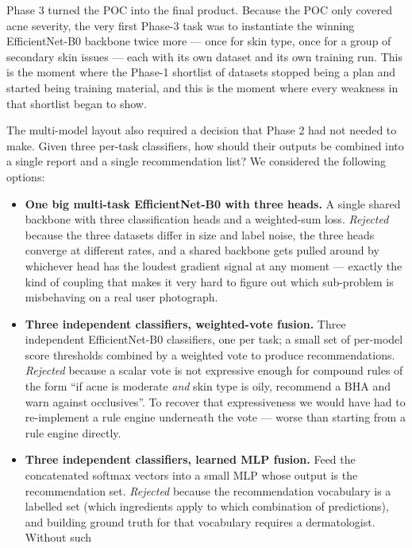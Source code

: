\documentclass[11pt,a4paper,oneside]{report}
\newcommand{\effnet}{EfficientNet-B0\xspace}
\begin{document}
Phase 3 turned the POC into the final product. Because the POC only
covered acne severity, the very first Phase-3 task was to
instantiate the winning \effnet backbone twice more --- once for
skin type, once for a group of secondary skin issues --- each with
its own dataset and its own training run. This is the moment where
the Phase-1 shortlist of datasets stopped being a plan and started
being training material, and this is the moment where every
weakness in that shortlist began to show.

The multi-model layout also required a decision that Phase 2 had
not needed to make. Given three per-task classifiers, how should
their outputs be combined into a single report and a single
recommendation list? We considered the following options:

\begin{itemize}
    \item \textbf{One big multi-task \effnet with three heads.} A
        single shared backbone with three classification heads and
        a weighted-sum loss. \emph{Rejected} because the three
        datasets differ in size and label noise, the three heads
        converge at different rates, and a shared backbone gets
        pulled around by whichever head has the loudest gradient
        signal at any moment --- exactly the kind of coupling that
        makes it very hard to figure out which sub-problem is
        misbehaving on a real user photograph.
    \item \textbf{Three independent classifiers, weighted-vote
        fusion.} Three independent \effnet classifiers, one per
        task; a small set of per-model score thresholds combined
        by a weighted vote to produce recommendations.
        \emph{Rejected} because a scalar vote is not expressive
        enough for compound rules of the form ``if acne is
        moderate \emph{and} skin type is oily, recommend a BHA
        and warn against occlusives''. To recover that
        expressiveness we would have had to re-implement a rule
        engine underneath the vote --- worse than starting from a
        rule engine directly.
    \item \textbf{Three independent classifiers, learned MLP
        fusion.} Feed the concatenated softmax vectors into a
        small MLP whose output is the recommendation set.
        \emph{Rejected} because the recommendation vocabulary is
        a labelled set (which ingredients apply to which
        combination of predictions), and building ground truth
        for that vocabulary requires a dermatologist. Without such

\end{itemize}
\end{document}
